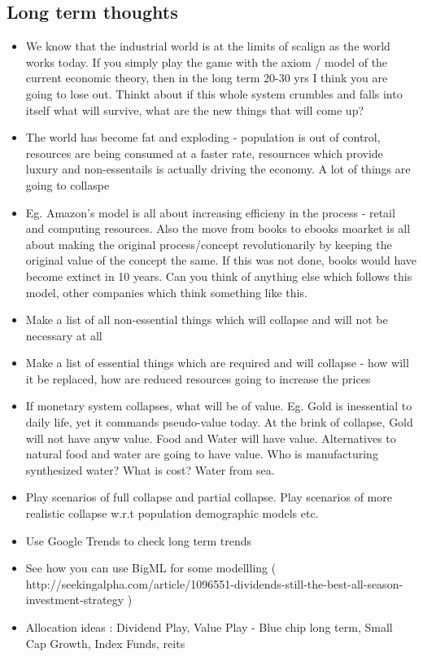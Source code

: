 \documentclass[a4paper]{article}
\begin{document}
\subsection{Long term thoughts}
\begin{itemize}
  \item We know that the industrial world is at the limits of scalign as the world works today. If you simply play the game with the axiom / model of the current economic theory, then in the long term 20-30 yrs I think you are going to lose out. Thinkt about if this whole system crumbles and falls into itself what will survive, what are the new things that will come up?
  \item The world has become fat and exploding - population is out of control, resources are being consumed at a faster rate, resournces which provide luxury and non-essentails is actually driving the economy. A lot of things are going to collaspe
  \item Eg. Amazon's model is all about increasing efficieny in the process - retail and computing resources. Also the move from books to ebooks moarket is all about making the original process/concept revolutionarily by keeping the original value of the concept the same. If this was not done, books would have become extinct in 10 years. Can you think of anything else which follows this model, other companies which think something like this.
  \item Make a list of all non-essential things which will collapse and will not be necessary at all
  \item Make a list of essential things which are required and will collapse - how will it be replaced, how are reduced resources going to increase the prices
  \item If monetary system collapses, what will be of value. Eg. Gold is inessential to daily life, yet it commands pseudo-value today. At the brink of collapse, Gold will not have anyw value. Food and Water will have value. Alternatives to natural food and water are going to have value. Who is manufacturing synthesized water? What is cost? Water from sea.
  \item Play scenarios of full collapse and partial collapse. Play scenarios of more realistic collapse w.r.t population demographic models etc.
\end{itemize}
\begin{itemize}
  \item Use Google Trends to check long term trends
  \item See how you can use BigML for some modellling ( http://seekingalpha.com/article/1096551-dividends-still-the-best-all-season-investment-strategy )
  \item Allocation ideas : Dividend Play, Value Play - Blue chip long term, Small Cap Growth, Index Funds, reits
\end{itemize}
\end{document}
